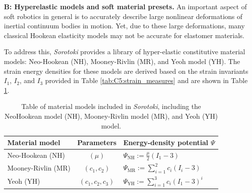 \textbf{B: Hyperelastic models and soft material presets.} An important aspect of soft robotics in general is to accurately describe large nonlinear deformations of inertial continuum bodies in motion. Yet, due to these large deformations, many classical Hookean elasticity models may not be accurate for elastomer materials. 

To address this, \textit{Sorotoki} provides a library of hyper-elastic constitutive material models: Neo-Hookean (NH), Mooney-Rivlin (MR), and Yeoh model (YH). The strain energy densities for these models are derived based on the strain invariants $I_1$, $I_2$, and $I_3$ provided in Table \ref{tab:C5:strain_measures} and are shown in Table \ref{tab:C5:elasticitymodels}.
%
\begin{table}[t]
    \renewcommand\arraystretch{1.25}
    \setlength{\tabcolsep}{2.25pt}
    \centering
    \caption{Table of material models included in \textit{Sorotoki}, including the NeoHookean model (NH), Mooney-Rivlin model (MR), and Yeoh (YH) model.}
    \label{tab:C5:elasticitymodels}
    \begin{tabular}{lcl}
        \hline
        Material model     & \;\;Parameters\;\; & \quad \;\; Energy-density potential $\Psi$                                     \\
        \hline
        Neo-Hookean (NH)   & $(\mu)$            & \quad \;\; $\Psi_{\textrm{NH}} := \frac{\mu}{2} \left(I_1 - 3 \right)$         \\
        Mooney-Rivlin (MR) & $(c_1,c_2)$        & \quad \;\; $\Psi_{\textrm{MR}} := \sum^{2}_{i=1} c_i \left(I_i - 3 \right)$    \\
        Yeoh (YH)          & $(c_1,c_2,c_3)$    & \quad \;\; $\Psi_{\textrm{YH}}  := \sum^{3}_{i=1} c_i \left(I_1 - 3 \right)^i$ \\
        \hline
    \end{tabular}
\end{table}
%
